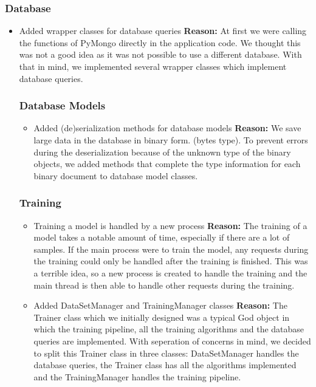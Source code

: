 \subsubsection{Database}
\begin{itemize}
    \item
    Added wrapper classes for database queries
    \newline
    \textbf{Reason:} At first we were calling the functions of PyMongo directly in
    the application code. We thought this was not a good idea as it was not possible
    to use a different database. With that in mind, we implemented several wrapper
    classes which implement database queries.

\subsubsection{Database Models}
\begin{itemize}
    \item
    Added (de)serialization methods for database models
    \newline
    \textbf{Reason:} We save large data in the database in binary form. 
    (bytes type). To prevent errors during the deserialization because of the
    unknown type of the binary objects, we added methods that complete
    the type information for each binary document to database model classes.
\end{itemize}

\subsubsection{Training}
\begin{itemize}
    \item
    Training a model is handled by a new process
    \newline
    \textbf{Reason:} The training of a model takes a notable amount of time,
    especially if there are a lot of samples. If the main process were to train
    the model, any requests during the training could only be handled after the
    training is finished. This was a terrible idea, so a new process is created
    to handle the training and the main thread is then able to handle other
    requests during the training.

    \item
    Added DataSetManager and TrainingManager classes
    \newline
    \textbf{Reason:} The Trainer class which we initially designed was a typical
    God object in which the training pipeline, all the training algorithms and
    the database queries are implemented. With seperation of concerns in mind, we
    decided to split this Trainer class in three classes: DataSetManager handles 
    the database queries, the Trainer class has all the algorithms implemented and
    the TrainingManager handles the training pipeline.


\end{itemize}
\end{itemize}
